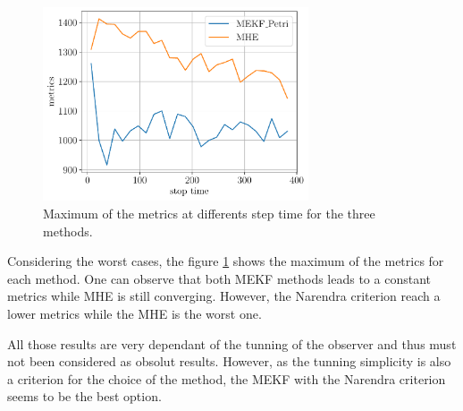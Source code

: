 \begin{figure}
    \center
    \includegraphics[width=0.7\textwidth]{../figures/stats_max.pdf}
    \caption{Maximum of the metrics at differents step time for the three methods.}
    \label{fig:stats_max}
\end{figure}

Considering the worst cases, the figure \ref{fig:stats_max} shows the maximum of the metrics for each method. One can observe that both MEKF methods leads to a constant metrics while MHE is still converging. However, the Narendra criterion reach a lower metrics while the MHE is the worst one. \medskip

All those results are very dependant of the tunning of the observer and thus must not been considered as obsolut results. However, as the tunning simplicity is also a criterion for the choice of the method, the MEKF with the Narendra criterion seems to be the best option. \medskip